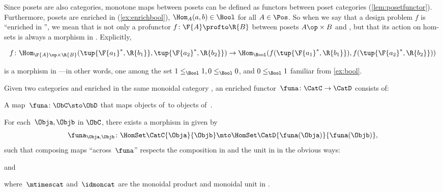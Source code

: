 {    Since posets are also categories, monotone maps between posets can be defined as functors between poset categories (\cref{lem:posetfunctor}).
    Furthermore, posets are enriched in \Bool (\cref{ex:enrichbool}), \ie  $\Hom_A(a,b) \in \Bool$ for all $A \in \Pos$.
    So when we say that a design problem $f$ is ``enriched in \Bool'', we mean that is not only a profunctor $f \colon \F{A} \profto \R{B}$ between posets $A\op \times B$ and \Bool, but that its action on hom-sets is always a morphism in \Bool.
    Explicitly,
    \begin{widepar}
        \begin{equation*}
            f \colon \Hom_{\F{A}\op \times \R{B}}(\tup{\F{a_1}^*,\R{b_1}}, \tup{\F{a_2}^*,\R{b_2}}) \to \Hom_\Bool(f(\tup{\F{a_1}^*,\R{b_1}}), f(\tup{\F{a_2}^*,\R{b_2}}))
        \end{equation*}
    \end{widepar}
    is a morphism in \Bool---in other words, one among the set $1 \leq_\Bool 1, 0 \leq_\Bool 0$, and $0 \leq_\Bool 1$ familiar from \cref{ex:bool}.
}


\begin{ctdefinition}
    \label{def:enrichedfunctor}
    Given two categories \CatC and \CatD enriched in the same monoidal category \CatV, an enriched functor~$\funa\colon \CatC \to \CatD$ consists of:
    \begin{compactenum}
        \item A map~$\funa\colon \ObC \sto \ObD$ that maps objects of~\CatC to objects of~\CatD.
        \item For each~$\Obja, \Objb$ in $\ObC$, there exists a morphism in \CatV given by
        \begin{equation*}
            \funa_{\Obja, \Objb} \colon \HomSet\CatC{\Obja}{\Objb} \mto \HomSet\CatD{\funa(\Obja)}{\funa(\Objb)},
        \end{equation*}
        such that composing maps ``across~$\funa$'' respects the composition in \CatC and the unit in \CatV in the obvious ways:
        \begin{center}
        \end{center}
        and
        \begin{center}
        \end{center}
        where~$\mtimescat$ and~$\idmoncat$ are the monoidal product and monoidal unit in \CatV.
    \end{compactenum}
\end{ctdefinition}

